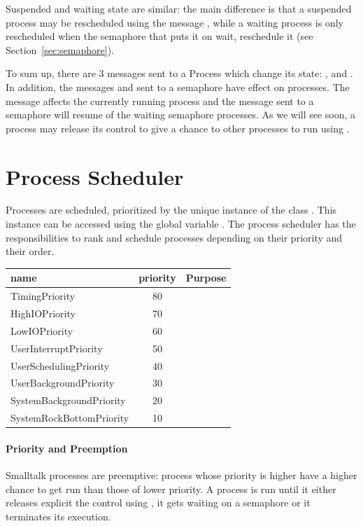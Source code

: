 \documentclass[a4paper,10pt,twoside]{book}
\begin{document}
Suspended and waiting state are similar: the main difference is that a suspended process may be rescheduled using the message , while a waiting process is only rescheduled when the semaphore that puts it on wait, reschedule it (see Section~\ref{sec:semaphore}).

To sum up, there are 3 messages sent to a Process which change its state: ,  and . In addition, the messages  and  sent to a semaphore have effect on processes. The message  affects the currently running process and the message  sent to a semaphore will resume of the waiting semaphore processes. As we will see soon, a process may release its control to give a chance to other processes to run using .


\section{Process Scheduler}

Processes are scheduled, \ie prioritized by the unique instance of the class . This instance can be accessed using the global variable
. The process scheduler has the responsibilities to rank and schedule processes depending on their priority and their order.

\begin{table}
\begin{tabular}{l|c|c}
	name& priority & Purpose\\ \hline
	TimingPriority&80&\\ 
	HighIOPriority&70&\\ 
	LowIOPriority&60&\\ 
	UserInterruptPriority&50&\\
	UserSchedulingPriority&40\\
	UserBackgroundPriority&30&\\ 
	SystemBackgroundPriority&20&\\ 
	SystemRockBottomPriority&10&\\ \hline
\end{tabular}
\end{table}

\paragraph{Priority and Preemption}
Smalltalk processes are preemptive: process whose priority is higher have a higher chance to get run than those of lower priority. A process is run until it either releases explicit the control using , it gets waiting on a semaphore or it terminates its execution. 
\end{document}
